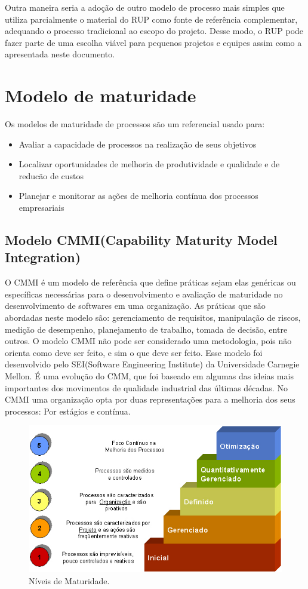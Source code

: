 Outra maneira seria a adoção de outro modelo de processo mais simples que utiliza parcialmente o material do RUP como fonte de referência complementar, adequando o processo tradicional ao escopo do projeto. Desse modo, o RUP pode fazer parte de uma escolha viável para pequenos projetos e equipes assim como a apresentada neste documento.

  \section{Modelo de maturidade}
  Os modelos de maturidade de processos são um referencial usado para:
\begin{itemize}
\item Avaliar a capacidade de processos na realização de seus objetivos
\item Localizar oportunidades de melhoria de produtividade e qualidade e de reducão de custos
\item Planejar e monitorar as ações de melhoria contínua dos processos empresariais
\end{itemize}

  \subsection{Modelo CMMI(Capability Maturity Model Integration)}
  O CMMI é um modelo de referência que define práticas sejam elas genéricas ou específicas necessárias para o desenvolvimento e avaliação de maturidade no desenvolvimento de softwares em uma organização. As práticas que são abordadas neste modelo são: gerenciamento de requisitos, manipulação de riscos, medição de desempenho, planejamento de trabalho, tomada de decisão, entre outros. O modelo CMMI não pode ser considerado uma metodologia, pois não orienta como deve ser feito, e sim o que deve ser feito. Esse modelo foi desenvolvido pelo SEI(Software Engineering Institute) da Universidade Carnegie Mellon. É uma evolução do CMM, que foi baseado em algumas das ideias mais importantes dos movimentos de qualidade industrial das últimas décadas.
No CMMI uma organização opta por duas representações para a melhoria dos seus processos: Por estágios e contínua.
  \begin{figure}[!htbp]
    \centering
    \includegraphics[scale=0.5]{figuras/cinco-niveis-maturidade-cmmi}
    \caption[Níveis de Maturidade]{Níveis de Maturidade. \footnotemark}
    \label{cinco-niveis-maturidade-cmmi}
  \end{figure}

